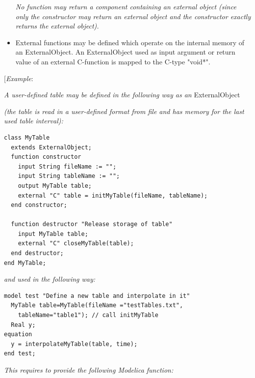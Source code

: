 \documentclass[10pt,a4paper]{report}
\begin{document}
\begin{itemize}
  \emph{No function may return a component containing an external object
  (since only the constructor may return an external object and the
  constructor exactly returns the external object).}
\item
  External functions may be defined which operate on the internal memory
  of an ExternalObject. An ExternalObject used as input argument or
  return value of an external C-function is mapped to the C-type
  "void*".
\end{itemize}

{[}\emph{Example}:

\emph{A user-defined table may be defined in the following way as an}
ExternalObject

\emph{(the table is read in a user-defined format from file and has
memory for the last used table interval):}

\begin{lstlisting}[language=modelica]
class MyTable
  extends ExternalObject;
  function constructor
    input String fileName := "";
    input String tableName := "";
    output MyTable table;
    external "C" table = initMyTable(fileName, tableName);
  end constructor;

  function destructor "Release storage of table"
    input MyTable table;
    external "C" closeMyTable(table);
  end destructor;
end MyTable;
\end{lstlisting}
\emph{and used in the following way:}

\begin{lstlisting}[language=modelica]
model test "Define a new table and interpolate in it"
  MyTable table=MyTable(fileName ="testTables.txt",
    tableName="table1"); // call initMyTable
  Real y;
equation
  y = interpolateMyTable(table, time);
end test;
\end{lstlisting}
\emph{This requires to provide the following Modelica function:}
\end{document}
